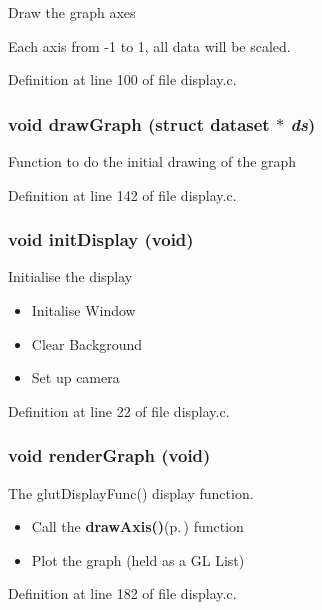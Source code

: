 Draw the graph axes

Each axis from -1 to 1, all data will be scaled. 

Definition at line 100 of file display.c.
\subsubsection{\setlength{\rightskip}{0pt plus 5cm}void draw\-Graph (struct {\bf dataset} $\ast$ {\em ds})}\label{display_8h_a18}


Function to do the initial drawing of the graph 

Definition at line 142 of file display.c.
\subsubsection{\setlength{\rightskip}{0pt plus 5cm}void init\-Display (void)}\label{display_8h_a13}


Initialise the display

\begin{itemize}
\item Initalise Window\item Clear Background\item Set up camera \end{itemize}


Definition at line 22 of file display.c.
\subsubsection{\setlength{\rightskip}{0pt plus 5cm}void render\-Graph (void)}\label{display_8h_a17}


The glut\-Display\-Func() display function.

\begin{itemize}
\item Call the {\bf draw\-Axis()}{\rm (p.\,\pageref{display_8h_a16})} function\item Plot the graph (held as a GL List) \end{itemize}


Definition at line 182 of file display.c.
